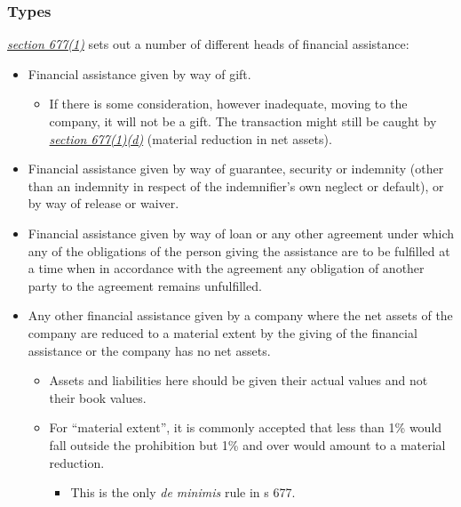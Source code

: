 \documentclass[
]{article}
\providecommand{\tightlist}{%
  \setlength{\itemsep}{0pt}\setlength{\parskip}{0pt}}
\begin{document}
\hypertarget{types}{%
\subsubsection{Types}\label{types}}

\emph{\href{https://uk.westlaw.com/8-505-7474?originationContext=document\&transitionType=PLDocumentLink\&contextData=(sc.Default)\&ppcid=52c063520c5f48d8a198d13504dc80c1}{section
677(1)}} sets out a number of different heads of financial assistance:

\begin{itemize}
\tightlist
\item
  Financial assistance given by way of gift.

  \begin{itemize}
  \tightlist
  \item
    If there is some consideration, however inadequate, moving to the
    company, it will not be a gift. The transaction might still be
    caught by
    \emph{\href{https://uk.westlaw.com/8-505-7474?originationContext=document\&transitionType=PLDocumentLink\&contextData=(sc.Default)\&ppcid=52c063520c5f48d8a198d13504dc80c1}{section
    677(1)(d)}} (material reduction in net assets).
  \end{itemize}
\item
  Financial assistance given by way of guarantee, security or indemnity
  (other than an indemnity in respect of the indemnifier's own neglect
  or default), or by way of release or waiver.
\item
  Financial assistance given by way of loan or any other agreement under
  which any of the obligations of the person giving the assistance are
  to be fulfilled at a time when in accordance with the agreement any
  obligation of another party to the agreement remains unfulfilled.
\item
  Any other financial assistance given by a company where the net assets
  of the company are reduced to a material extent by the giving of the
  financial assistance or the company has no net assets.

  \begin{itemize}
  \tightlist
  \item
    Assets and liabilities here should be given their actual values and
    not their book values.
  \item
    For ``material extent'', it is commonly accepted that less than 1\%
    would fall outside the prohibition but 1\% and over would amount to
    a material reduction.

    \begin{itemize}
    \tightlist
    \item
      This is the only \emph{de minimis} rule in s 677.
    \end{itemize}
  \end{itemize}
\end{itemize}
\end{document}
